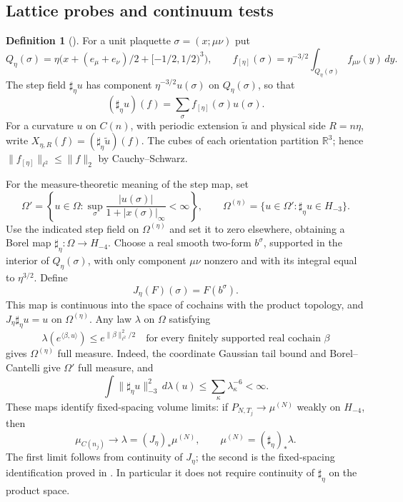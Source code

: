 \documentclass[11pt,letterpaper,reqno]{amsart}
\theoremstyle{definition}
\newtheorem{qcmdefinition}[qcmproposition]{Definition}
\newenvironment{definition}[1][]{\pushQED{\qed}\renewcommand{\qedsymbol}{$\blacksquare$}\begin{qcmdefinition}[#1]}{\popQED\end{qcmdefinition}}
\begin{document}
\subsection{Lattice probes and continuum tests}
\begin{definition}\label{qcm:step-field}
For a unit plaquette $\sigma=(x;\mu\nu)$ put
\[
 Q_\eta(\sigma)=\eta\bigl(x+(e_\mu+e_\nu)/2+[-1/2,1/2)^3\bigr),
 \qquad f_{[\eta]}(\sigma)
       =\eta^{-3/2}\int_{Q_\eta(\sigma)}f_{\mu\nu}(y)\,dy.
\]
The step field $\sharp_\eta u$ has component
$\eta^{-3/2}u(\sigma)$ on $Q_\eta(\sigma)$, so that
\[
 (\sharp_\eta u)(f)=\sum_\sigma f_{[\eta]}(\sigma)u(\sigma).
\]
For a curvature $u$ on $C(n)$, with periodic extension
$\widetilde u$ and physical side $R=n\eta$, write
$X_{\eta,R}(f)=(\sharp_\eta\widetilde u)(f)$.
The cubes of each orientation partition $\mathbb R^3$; hence
$\|f_{[\eta]}\|_{\ell^2}\le\|f\|_2$ by Cauchy--Schwarz.

For the measure-theoretic meaning of the step map, set
\[
 \Omega'=\left\{u\in\Omega:
 \sup_\sigma\frac{|u(\sigma)|}{1+|x(\sigma)|_\infty}<\infty\right\},
 \qquad
 \Omega^{(\eta)}=\{u\in\Omega':\sharp_\eta u\in H_{-3}\}.
\]
Use the indicated step field on $\Omega^{(\eta)}$ and set it to
zero elsewhere, obtaining a Borel map $\sharp_\eta:\Omega\to H_{-4}$.
Choose a real smooth two-form $b^\sigma$, supported in the
interior of $Q_\eta(\sigma)$, with only component $\mu\nu$
nonzero and with its integral equal to $\eta^{3/2}$. Define
\[
 J_\eta(F)(\sigma)=F(b^\sigma).
\]
This map is continuous into the space of cochains with the product
topology, and $J_\eta\sharp_\eta u=u$ on $\Omega^{(\eta)}$.
Any law $\lambda$ on $\Omega$ satisfying
\[
 \lambda(e^{\langle\beta,u\rangle})\le e^{\|\beta\|_{\ell^2}^2/2}
 \quad\text{for every finitely supported real cochain }\beta
\]
gives $\Omega^{(\eta)}$ full measure. Indeed, the coordinate Gaussian
tail bound and Borel--Cantelli give $\Omega'$ full measure, and
\[
 \int\|\sharp_\eta u\|_{-3}^2\,d\lambda(u)
       \le\sum_\kappa\lambda_\kappa^{-6}<\infty.
\]
These maps identify fixed-spacing volume limits:
if $P_{N,T_j}\to\mu^{(N)}$ weakly on $H_{-4}$, then
\[
 \mu_{C(n_j)}\longrightarrow\lambda=(J_\eta)_*\mu^{(N)},
 \qquad \mu^{(N)}=(\sharp_\eta)_*\lambda.
\]
The first limit follows from continuity of $J_\eta$; the second
is the fixed-spacing identification proved in
\cite[Section~6.3]{QEDConstruction}. In particular it does not
require continuity of $\sharp_\eta$ on the product space.
\end{definition}
\end{document}
